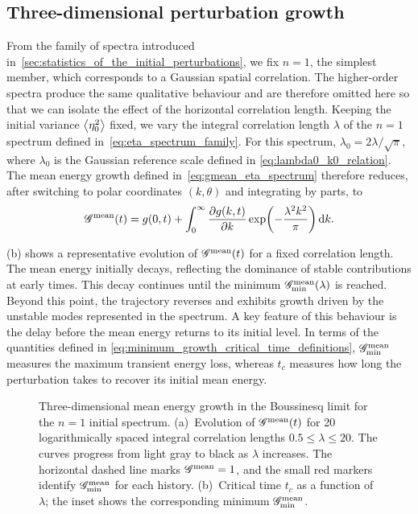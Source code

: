 \subsection{Three-dimensional perturbation growth}
From the family of spectra introduced in~\cref{sec:statistics_of_the_initial_perturbations}, we fix
\(n=1\), the simplest member, which corresponds to a Gaussian spatial correlation. The
higher-order spectra produce the same qualitative behaviour and are therefore omitted here so that
we can isolate the effect of the horizontal correlation length. Keeping the initial variance
\(\left\langle \eta_0^2 \right\rangle\) fixed, we vary the integral correlation length \(\lambda\) of the \(n=1\)
spectrum defined in~\eqref{eq:eta_spectrum_family}. For this spectrum,
\(\lambda_0=2\lambda/\sqrt{\pi}\), where \(\lambda_0\) is the Gaussian reference scale defined in
\eqref{eq:lambda0_k0_relation}. The mean energy growth defined in~\eqref{eq:gmean_eta_spectrum}
therefore reduces, after switching to polar coordinates \((k,\theta)\) and integrating by parts, to
\begin{equation}
    \label{eq:bq_gmean_isotropic}
    \mathscr{G}^{\mathrm{mean}}(t)
    =
    g(0,t)
    +
    \int_{0}^{\infty}
    \frac{\partial g(k,t)}{\partial k}
    \exp\!\left(-\frac{\lambda^{2}k^{2}}{\pi}\right)\mathrm{d}k.
\end{equation}

(b) shows a representative evolution of \(\mathscr{G}^{\mathrm{mean}}(t)\) for a
fixed correlation length. The mean energy initially decays, reflecting the dominance of stable
contributions at early times. This decay continues until the minimum \(\mathscr{G}^{\mathrm{mean}}_{\min}(\lambda)\) is
reached. Beyond this point, the trajectory reverses and exhibits growth driven by the unstable
modes represented in the spectrum. A key feature of this behaviour is the delay before the mean
energy returns to its initial level. In terms of the quantities defined in
\eqref{eq:minimum_growth_critical_time_definitions}, \(\mathscr{G}^{\mathrm{mean}}_{\min}\) measures the maximum transient
energy loss, whereas \(t_c\) measures how long the perturbation takes to recover its initial mean
energy.

\begin{figure}
  \centering
  \begin{minipage}{0.48\textwidth}
    \centering
    
  \end{minipage}
  \hfill
  \begin{minipage}{0.48\textwidth}
    \centering
    
  \end{minipage}
  \caption{Three-dimensional mean energy growth in the Boussinesq limit for the \(n=1\) initial
  spectrum. (a)~Evolution of \(\mathscr{G}^{\mathrm{mean}}(t)\) for 20 logarithmically spaced integral correlation
  lengths \(0.5\leq\lambda\leq20\). The curves progress from light gray to black as \(\lambda\)
  increases. The horizontal dashed line marks \(\mathscr{G}^{\mathrm{mean}}=1\), and the small red markers identify
  \(\mathscr{G}^{\mathrm{mean}}_{\min}\) for each history. (b)~Critical time \(t_c\) as a function of \(\lambda\);
  the inset shows the corresponding minimum \(\mathscr{G}^{\mathrm{mean}}_{\min}\).}
  \label{fig:BQ_P3_Gmean_analysis}
\end{figure}

